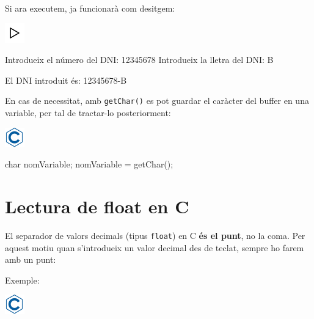 \documentclass[]{book}
\newenvironment{Shaded}{\begin{snugshade}}{\end{snugshade}}
\newcommand{\DataTypeTok}[1]{\textcolor[rgb]{0.13,0.29,0.53}{#1}}
\newcommand{\DecValTok}[1]{\textcolor[rgb]{0.00,0.00,0.81}{#1}}
\newcommand{\NormalTok}[1]{#1}
\begin{document}
Si ara executem, ja funcionarà com desitgem:

\includegraphics{./img/play.png}

\begin{Shaded}
\begin{Highlighting}[]
\NormalTok{Introdueix el número del DNI: }\DecValTok{12345678}
\NormalTok{Introdueix la lletra del DNI: B}

\NormalTok{El DNI introduit és: }\DecValTok{12345678}\NormalTok{-B}
\end{Highlighting}
\end{Shaded}

En cas de necessitat, amb \texttt{getChar()} es pot guardar el caràcter
del buffer en una variable, per tal de tractar-lo posteriorment:

\includegraphics{./img/c.png}

\begin{Shaded}
\begin{Highlighting}[]
\DataTypeTok{char}\NormalTok{ nomVariable;}
\NormalTok{nomVariable = getChar();}
\end{Highlighting}
\end{Shaded}

\section{Lectura de float en C}\label{lectura-de-float-en-c}

El separador de valors decimals (tipus \texttt{float}) en C \textbf{és
el punt}, no la coma. Per aquest motiu quan s'introdueix un valor
decimal des de teclat, sempre ho farem amb un punt:

Exemple:

\includegraphics{./img/c.png}
\end{document}
